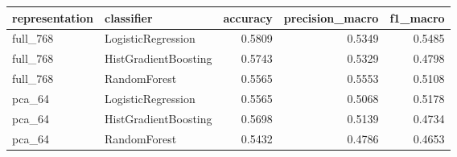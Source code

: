 \begin{tabular}{llrrr}
\toprule
representation & classifier & accuracy & precision\_macro & f1\_macro \\
\midrule
full\_768 & LogisticRegression & 0.5809 & 0.5349 & 0.5485 \\
full\_768 & HistGradientBoosting & 0.5743 & 0.5329 & 0.4798 \\
full\_768 & RandomForest & 0.5565 & 0.5553 & 0.5108 \\
pca\_64 & LogisticRegression & 0.5565 & 0.5068 & 0.5178 \\
pca\_64 & HistGradientBoosting & 0.5698 & 0.5139 & 0.4734 \\
pca\_64 & RandomForest & 0.5432 & 0.4786 & 0.4653 \\
\bottomrule
\end{tabular}
